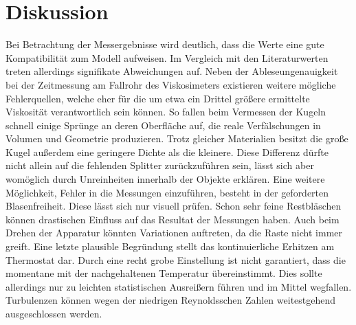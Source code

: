 \section{Diskussion}
\label{sec:diskussion}

Bei Betrachtung der Messergebnisse wird deutlich, dass die Werte eine gute Kompatibilität zum Modell aufweisen.
Im Vergleich mit den Literaturwerten treten allerdings signifikate Abweichungen auf. Neben der Ableseungenauigkeit
bei der Zeitmessung am Fallrohr des Viskosimeters existieren weitere mögliche Fehlerquellen, welche eher für die
um etwa ein Drittel größere ermittelte Viskosität verantwortlich sein können. So fallen beim Vermessen der Kugeln
schnell einige Sprünge an deren Oberfläche auf, die reale Verfälschungen in Volumen und Geometrie produzieren. Trotz
gleicher Materialien besitzt die große Kugel außerdem eine geringere Dichte als die kleinere. Diese Differenz dürfte
nicht allein auf die fehlenden Splitter zurückzuführen sein, lässt sich aber womöglich durch Unreinheiten innerhalb
der Objekte erklären. Eine weitere Möglichkeit, Fehler in die Messungen einzuführen, besteht in der geforderten
Blasenfreiheit. Diese lässt sich nur visuell prüfen. Schon sehr feine Restbläschen können drastischen Einfluss auf
das Resultat der Messungen haben. Auch beim Drehen der Apparatur könnten Variationen auftreten, da die Raste nicht
immer greift. Eine letzte plausible Begründung stellt das kontinuierliche Erhitzen am Thermostat dar. Durch eine recht
grobe Einstellung ist nicht garantiert, dass die momentane mit der nachgehaltenen Temperatur übereinstimmt. Dies sollte
allerdings nur zu leichten statistischen Ausreißern führen und im Mittel wegfallen. Turbulenzen können wegen der niedrigen
Reynoldsschen Zahlen weitestgehend ausgeschlossen werden.

\newpage
